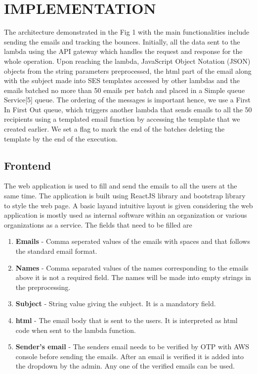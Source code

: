 \chapter{IMPLEMENTATION}
\label{ch:lex_yacc}


The architecture demonstrated in the Fig 1 with the main functionalities include sending the emails and tracking the bounces. Initially, all the data sent to the lambda using the API gateway which handles the request and response for the whole operation. Upon reaching the lambda, JavaScript Object Notation (JSON) objects from the string parameters preprocessed, the html part of the email along with the subject made into SES templates accessed by other lambdas and the emails batched no more than 50 emails per batch and placed in a Simple queue Service[5] queue. The ordering of the messages is important hence, we use a First In First Out queue, which triggers another lambda that sends emails to all the 50 recipients using a templated email function by accessing the template that we created earlier. We set a flag to mark the end of the batches deleting the template by the end of the execution.


\section{Frontend}

The web application is used to fill and send the emails to all the users at the same time. The application is built using ReactJS library and bootstrap library to style the web page. A basic layand intuitive layout is given considering the web application is mostly used as internal software within an organization or various organizations as a service. 
The fields that need to be filled are

\begin{enumerate}
	\item \textbf{Emails} - Comma seperated values of the emails with spaces and that follows the standard email format.  
	\item \textbf{Names} - Comma separated values of the names corresponding to the emails above it is not a required field. The names will be made into empty strings in the preprocessing.
	\item \textbf{Subject} - String value giving the subject. It is a mandatory field.
	\item \textbf{html} - The email body that is sent to the users. It is interpreted as html code when sent to the lambda function.
	\item \textbf{Sender's email} - The senders email needs to be verified by OTP with AWS console before sending the emails. After an email is verified it is added into the dropdown by the admin. Any one of the verified emails can be used.
\end{enumerate}


